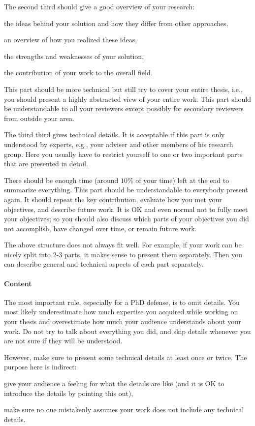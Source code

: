 \documentclass[12pt]{article}
\begin{document}
The second third should give a good overview of your research:
\begin{compactitem}
 \item the ideas behind your solution and how they differ from other approaches,
 \item an overview of how you realized these ideas,
 \item the strengths and weaknesses of your solution,
 \item the contribution of your work to the overall field.
\end{compactitem}
This part should be more technical but still try to cover your entire thesis, i.e., you should present a highly abstracted view of your entire work.
This part should be understandable to all your reviewers except possibly for secondary reviewers from outside your area.
\medskip

The third third gives technical details.
It is acceptable if this part is only understood by experts, e.g., your adviser and other members of his research group.
Here you usually have to restrict yourself to one or two important parts that are presented in detail.
\medskip

There should be enough time (around $10\%$ of your time) left at the end to summarize everything.
This part should be understandable to everybody present again.
It should repeat the key contribution, evaluate how you met your objectives, and describe future work.
It is OK and even normal not to fully meet your objectives; so you should also discuss which parts of your objectives you did not accomplish, have changed over time, or remain future work.
\medskip

The above structure does not always fit well.
For example, if your work can be nicely split into 2-3 parts, it makes sense to present them separately.
Then you can describe general and technical aspects of each part separately.

\paragraph{Content}
The most important rule, especially for a PhD defense, is to omit details.
You most likely underestimate how much expertise you acquired while working on your thesis and overestimate how much your audience understands about your work.
Do not try to talk about everything you did, and skip details whenever you are not sure if they will be understood.
\medskip

However, make sure to present some technical details at least once or twice.
The purpose here is indirect:
\begin{compactitem}
 \item give your audience a feeling for what the details are like (and it is OK to introduce the details by pointing this out),
 \item make sure no one mistakenly assumes your work does not include any technical details.
\end{compactitem}
\medskip
\end{document}
